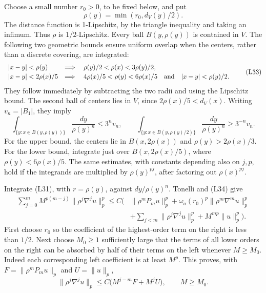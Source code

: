 \documentclass[
  11pt,
]{article}
\begin{document}
Choose a small number \(r_0>0\), to be fixed below, and put \[
\rho(y)=\min(r_0,d_V(y)/2).                                       \tag{L32}
\] The distance function is 1-Lipschitz, by the triangle inequality and
taking an infimum. Thus \(\rho\) is \(1/2\)-Lipschitz. Every ball
\(B(y,\rho(y))\) is contained in \(V\). The following two geometric
bounds ensure uniform overlap when the centers, rather than a discrete
covering, are integrated: \[
\begin{array}{ll}
|x-y|<\rho(y)&\Longrightarrow\quad
       \rho(y)/2<\rho(x)<3\rho(y)/2,\\[2pt]
|x-y|<2\rho(x)/5&\Longrightarrow\quad
       4\rho(x)/5<\rho(y)<6\rho(x)/5
       \quad\hbox{and}\quad |x-y|<\rho(y)/2.
\end{array}                                                       \tag{L33}
\] They follow immediately by subtracting the two radii and using the
Lipschitz bound. The second ball of centers lies in \(V\), since
\(2\rho(x)/5<d_V(x)\). Writing \(v_n=|B_1|\), they imply \[
\int_{\{y:x\in B(y,\rho(y))\}}\frac{dy}{\rho(y)^n}\leq3^n v_n,
\qquad
\int_{\{y:x\in B(y,\rho(y)/2)\}}\frac{dy}{\rho(y)^n}\geq3^{-n}v_n.
                                                                    \tag{L34}
\] For the upper bound, the centers lie in \(B(x,2\rho(x))\) and
\(\rho(y)>2\rho(x)/3\). For the lower bound, integrate just over
\(B(x,2\rho(x)/5)\), where \(\rho(y)<6\rho(x)/5\). The same estimates,
with constants depending also on \(j,p\), hold if the integrands are
multiplied by \(\rho(y)^{pj}\), after factoring out \(\rho(x)^{pj}\).

Integrate (L31), with \(r=\rho(y)\), against \(dy/\rho(y)^n\). Tonelli
and (L34) give \[
\begin{split}
\sum_{j=0}^m M^{p(m-j)}\|\rho^j\nabla^j u\|_p^p
\leq C\bigg(&\|\rho^mP_mu\|_p^p
 +\omega_a(r_0)^p\|\rho^m\nabla^m u\|_p^p\\
 &+\sum_{j<m}\|\rho^j\nabla^j u\|_p^p+M^{mp}\|u\|_p^p\bigg).
\end{split}                                                       \tag{L35}
\] First choose \(r_0\) so the coefficient of the highest-order term on
the right is less than \(1/2\). Next choose \(M_0\geq1\) sufficiently
large that the terms of all lower orders on the right can be absorbed by
half of their terms on the left whenever \(M\geq M_0\). Indeed each
corresponding left coefficient is at least \(M^p\). This proves, with
\(F=\|\rho^mP_mu\|_p\) and \(U=\|u\|_p\), \[
\|\rho^j\nabla^j u\|_p
\leq C\bigl(M^{j-m}F+M^jU\bigr),\qquad M\geq M_0.               \tag{L36}
\]
\end{document}
